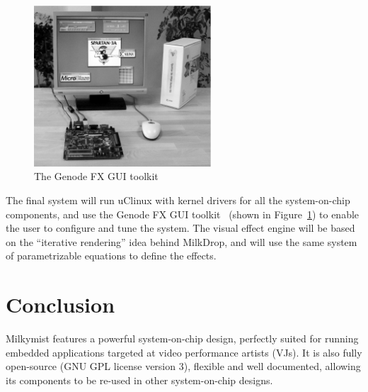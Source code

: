 \documentclass[a4paper,11pt,twocolumn]{paper}
\begin{document}
\begin{figure}
\centering
\includegraphics[height=60mm]{genode_bw.eps}
\caption{The Genode FX GUI toolkit}
\label{fig:genodefx}
\end{figure}

The final system will run uClinux with kernel drivers for all the system-on-chip components, and use the Genode FX GUI toolkit~\cite{genodefx} (shown in Figure~\ref{fig:genodefx}) to enable the user to configure and tune the system. The visual effect engine will be based on the ``iterative rendering'' idea behind MilkDrop, and will use the same system of parametrizable equations to define the effects.

\section{Conclusion}
Milkymist features a powerful system-on-chip design, perfectly suited for running embedded applications targeted at video performance artists (VJs). It is also fully open-source (GNU GPL license version 3), flexible and well documented, allowing its components to be re-used in other system-on-chip designs.

{}

\end{document}
